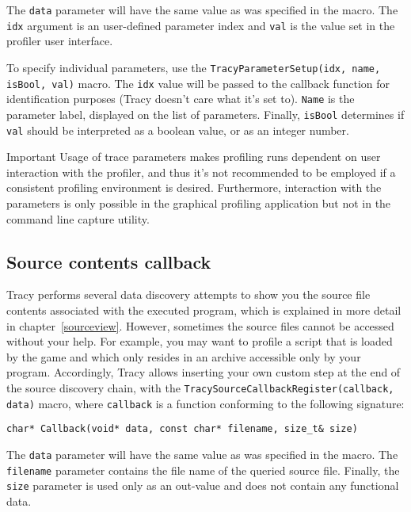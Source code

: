 \documentclass[hidelinks,titlepage,a4paper,twoside]{article}
\begin{document}
The \texttt{data} parameter will have the same value as was specified in the macro. The \texttt{idx} argument is an user-defined parameter index and \texttt{val} is the value set in the profiler user interface.

To specify individual parameters, use the \texttt{TracyParameterSetup(idx, name, isBool, val)} macro. The \texttt{idx} value will be passed to the callback function for identification purposes (Tracy doesn't care what it's set to). \texttt{Name} is the parameter label,  displayed on the list of parameters. Finally, \texttt{isBool} determines if \texttt{val} should be interpreted as a boolean value, or as an integer number.

\begin{bclogo}[
noborder=true,
couleur=black!5,
logo=\bcbombe
]{Important}
Usage of trace parameters makes profiling runs dependent on user interaction with the profiler, and thus it's not recommended to be employed if a consistent profiling environment is desired. Furthermore, interaction with the parameters is only possible in the graphical profiling application but not in the command line capture utility.
\end{bclogo}

\subsection{Source contents callback}

Tracy performs several data discovery attempts to show you the source file contents associated with the executed program, which is explained in more detail in chapter~\ref{sourceview}. However, sometimes the source files cannot be accessed without your help. For example, you may want to profile a script that is loaded by the game and which only resides in an archive accessible only by your program. Accordingly, Tracy allows inserting your own custom step at the end of the source discovery chain, with the \texttt{TracySourceCallbackRegister(callback, data)} macro, where \texttt{callback} is a function conforming to the following signature:

\begin{lstlisting}
char* Callback(void* data, const char* filename, size_t& size)
\end{lstlisting}

The \texttt{data} parameter will have the same value as was specified in the macro. The \texttt{filename} parameter contains the file name of the queried source file. Finally, the \texttt{size} parameter is used only as an out-value and does not contain any functional data.
\end{document}
